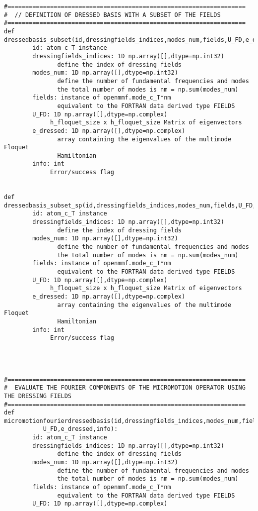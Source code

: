 \documentclass[10pt,a4paper]{article}
\begin{document}
\begin{verbatim}
#===================================================================
#  // DEFINITION OF DRESSED BASIS WITH A SUBSET OF THE FIELDS
#===================================================================
def dressedbasis_subset(id,dressingfields_indices,modes_num,fields,U_FD,e_dressed,info):
        id: atom_c_T instance
        dressingfields_indices: 1D np.array([],dtype=np.int32)
               define the index of dressing fields
        modes_num: 1D np.array([],dtype=np.int32)
               define the number of fundamental frequencies and modes
               the total number of modes is nm = np.sum(modes_num)
        fields: instance of openmmf.mode_c_T*nm 
               equivalent to the FORTRAN data derived type FIELDS
        U_FD: 1D np.array([],dtype=np.complex)
             h_floquet_size x h_floquet_size Matrix of eigenvectors            
        e_dressed: 1D np.array([],dtype=np.complex)
               array containing the eigenvalues of the multimode Floquet
               Hamiltonian
        info: int
             Error/success flag


def dressedbasis_subset_sp(id,dressingfields_indices,modes_num,fields,U_FD,e_dressed,info):
        id: atom_c_T instance
        dressingfields_indices: 1D np.array([],dtype=np.int32)
               define the index of dressing fields
        modes_num: 1D np.array([],dtype=np.int32)
               define the number of fundamental frequencies and modes
               the total number of modes is nm = np.sum(modes_num)
        fields: instance of openmmf.mode_c_T*nm 
               equivalent to the FORTRAN data derived type FIELDS
        U_FD: 1D np.array([],dtype=np.complex)
             h_floquet_size x h_floquet_size Matrix of eigenvectors            
        e_dressed: 1D np.array([],dtype=np.complex)
               array containing the eigenvalues of the multimode Floquet
               Hamiltonian
        info: int
             Error/success flag


     

#===================================================================
#  EVALUATE THE FOURIER COMPONENTS OF THE MICROMOTION OPERATOR USING THE DRESSING FIELDS
#===================================================================
def micromotionfourierdressedbasis(id,dressingfields_indices,modes_num,fields,
           U_FD,e_dressed,info):
        id: atom_c_T instance
        dressingfields_indices: 1D np.array([],dtype=np.int32)
               define the index of dressing fields
        modes_num: 1D np.array([],dtype=np.int32)
               define the number of fundamental frequencies and modes
               the total number of modes is nm = np.sum(modes_num)
        fields: instance of openmmf.mode_c_T*nm 
               equivalent to the FORTRAN data derived type FIELDS
        U_FD: 1D np.array([],dtype=np.complex)
              

\end{verbatim}
\end{document}
